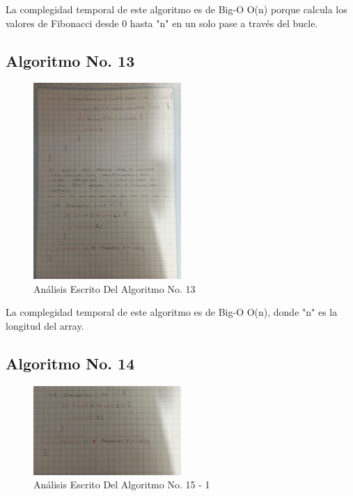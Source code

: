 \documentclass[journal, spanish]{IEEEtran}
\begin{document}
La complegidad temporal de este algoritmo es de Big-O O(n) porque calcula los valores de Fibonacci desde 0 hasta "n" en un solo pase a través del bucle.

\subsection{Algoritmo No. 13}

\begin{figure}[H]
  \centering
  \includegraphics[width=0.5\textwidth]{images/IMG_20230913_023621.jpg}
  \caption{Análisis Escrito Del Algoritmo No. 13}
  \label{fig:nombre_de_tu_imagen}
\end{figure}

La complegidad temporal de este algoritmo es de Big-O O(n), donde "n" es la longitud del array.

\subsection{Algoritmo No. 14}

\begin{figure}[H]
  \centering
  \includegraphics[width=0.5\textwidth]{images/IMG_20230913_023622.jpg}
  \caption{Análisis Escrito Del Algoritmo No. 15 - 1}
  \label{fig:nombre_de_tu_imagen}
\end{figure}
\end{document}

